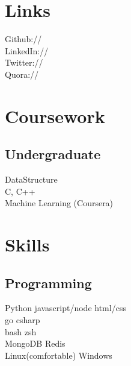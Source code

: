 \documentclass[]{deedy-resume-openfont}
\begin{document}
\begin{minipage}[t]{0.33\textwidth}
\section{Links}
Github:// \href{https://github.com/arindampradhan}{} \\
LinkedIn://  \href{https://in.linkedin.com/in/arindampradhan}{} \\
Twitter://  \href{https://twitter.com/rrindam}{} \\
Quora://  \href{https://www.quora.com/profile/Arindam-Pradhan}{}
\sectionsep


\section{Coursework}

\subsection{Undergraduate}
DataStructure \\
C, C++ \\
Machine Learning (Coursera) \\
\sectionsep


\section{Skills}
\subsection{Programming}
\textbullet{} Python \textbullet{} javascript/node \break \textbullet{} html/css \\
\textbullet{} go \textbullet{} csharp \\
\textbullet{} bash \textbullet{} zsh \\
\textbullet{} MongoDB \textbullet{} Redis \\
Linux(comfortable) \textbullet{} Windows \\
\sectionsep


\end{minipage}
\end{document}
